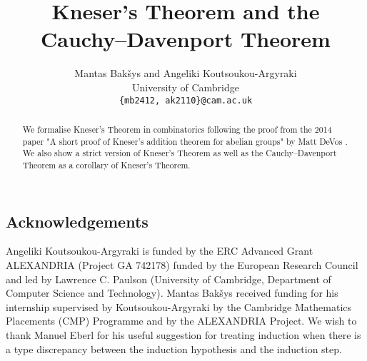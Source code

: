 \documentclass[11pt,a4paper]{article}
\begin{document}
\title{Kneser's Theorem and the Cauchy--Davenport Theorem}
\author{Mantas Bak\v{s}ys and Angeliki Koutsoukou-Argyraki \\
University of Cambridge\\
\texttt{\{mb2412, ak2110\}@cam.ac.uk}}

\maketitle

\begin{abstract}
We formalise Kneser's Theorem in combinatorics \cite{Nathanson_book, Ruzsa_book} following the proof from the 2014 paper "A short proof of Kneser’s addition theorem for abelian groups" by Matt DeVos \cite{DeVos_Kneser}. We also show a strict version of Kneser's Theorem as well as the Cauchy--Davenport Theorem as a corollary of Kneser's Theorem. 
\end{abstract}
\newpage
\tableofcontents

\subsection*{Acknowledgements}
Angeliki Koutsoukou-Argyraki is funded by the ERC Advanced Grant ALEXANDRIA (Project GA
742178) funded by the European Research Council and led by Lawrence C. Paulson 
(University of Cambridge, Department of Computer Science and Technology). 
Mantas Bak\v{s}ys received funding for his internship supervised by Koutsoukou-Argyraki by the 
Cambridge Mathematics Placements (CMP) Programme and by the ALEXANDRIA Project. 
We wish to thank Manuel Eberl for his useful 
suggestion for treating induction when there is a type discrepancy between the induction hypothesis
and the induction step.
\newpage






\end{document}
